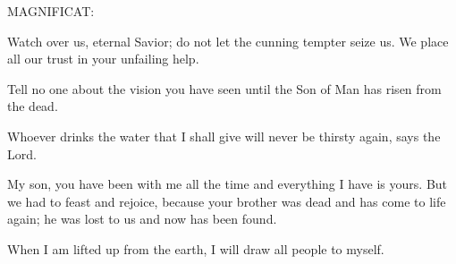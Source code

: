 \noindent MAGNIFICAT:
\begin{description}[labelindent=\parindent, leftmargin=*]
\item [Week 1:]	Watch over us, eternal Savior; do not let the cunning tempter seize us. We place all our trust in your unfailing help.
\item [Week 2:]	Tell no one about the vision you have seen until the Son of Man has risen from the dead.
\item [Week 3:]	Whoever drinks the water that I shall give will never be thirsty again, says the Lord.
\item [Week 4:]	My son, you have been with me all the time and everything I have is yours. But we had to feast and rejoice, because your brother was dead and has come to life again; he was lost to us and now has been found.
\item [Week 5:]	When I am lifted up from the earth, I will draw all people to myself.
\end{description}